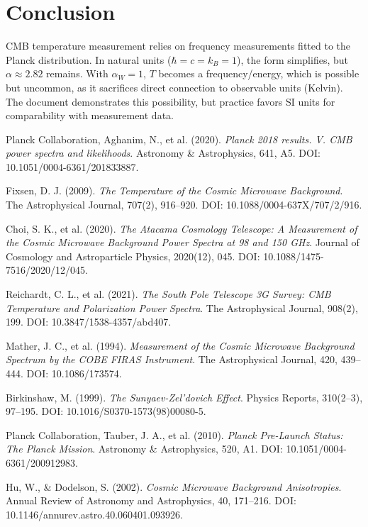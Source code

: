 \documentclass[12pt,a4paper]{article}
\begin{document}
	\section{Conclusion}
	
	CMB temperature measurement relies on frequency measurements fitted to the Planck distribution. In natural units ($\hbar = c = k_B = 1$), the form simplifies, but $\alpha \approx 2.82$ remains. With $\alpha_W = 1$, $T$ becomes a frequency/energy, which is possible but uncommon, as it sacrifices direct connection to observable units (Kelvin). The document demonstrates this possibility, but practice favors SI units for comparability with measurement data.
	
	\begin{thebibliography}{9}
		Planck Collaboration, Aghanim, N., et al. (2020). 
		\textit{Planck 2018 results. V. CMB power spectra and likelihoods}. 
		Astronomy \& Astrophysics, 641, A5. 
		DOI: 10.1051/0004-6361/201833887.
		
		Fixsen, D. J. (2009). \textit{The Temperature of the Cosmic Microwave Background}. 
		The Astrophysical Journal, 707(2), 916–920. 
		DOI: 10.1088/0004-637X/707/2/916.
		
		Choi, S. K., et al. (2020).
		\textit{The Atacama Cosmology Telescope: A Measurement of the Cosmic Microwave Background Power Spectra at 98 and 150 GHz}.
		Journal of Cosmology and Astroparticle Physics, 2020(12), 045. 
		DOI: 10.1088/1475-7516/2020/12/045. 
		
		Reichardt, C. L., et al. (2021). \textit{The South Pole Telescope 3G Survey: CMB Temperature and Polarization Power Spectra}. 
		The Astrophysical Journal, 908(2), 199. 
		DOI: 10.3847/1538-4357/abd407.
		
		Mather, J. C., et al. (1994). \textit{Measurement of the Cosmic Microwave Background Spectrum by the COBE FIRAS Instrument}. 
		The Astrophysical Journal, 420, 439–444. 
		DOI: 10.1086/173574.
		
		Birkinshaw, M. (1999). \textit{The Sunyaev-Zel’dovich Effect}. 
		Physics Reports, 310(2–3), 97–195.
		DOI: 10.1016/S0370-1573(98)00080-5. 
		
		Planck Collaboration, Tauber, J. A., et al. (2010). \textit{Planck Pre-Launch Status: The Planck Mission}. 
		Astronomy \& Astrophysics, 520, A1. 
		DOI: 10.1051/0004-6361/200912983.
		
		Hu, W., \& Dodelson, S. (2002). \textit{Cosmic Microwave Background Anisotropies}. 
		Annual Review of Astronomy and Astrophysics, 40, 171–216. 
		DOI: 10.1146/annurev.astro.40.060401.093926. 
		
	\end{thebibliography}
	
\end{document}
